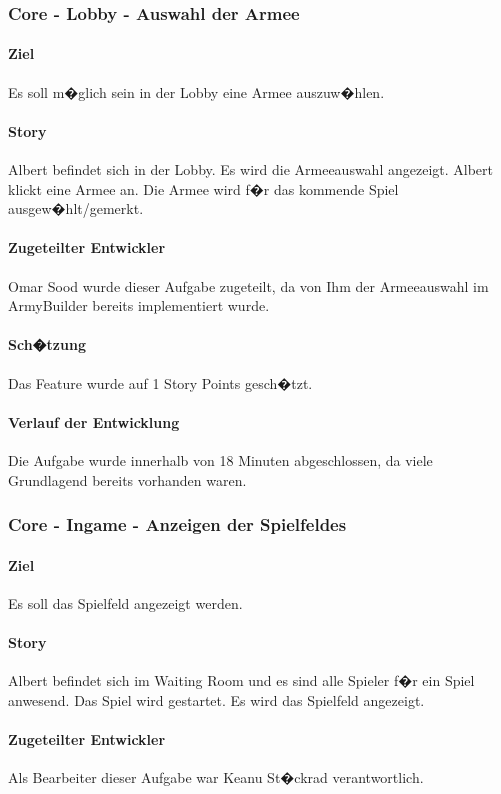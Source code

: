 \documentclass[12pt, titlepage]{scrartcl}
\begin{document}
		\subsubsection{Core - Lobby - Auswahl der Armee }
		\paragraph{Ziel} Es soll m�glich sein in der Lobby eine Armee auszuw�hlen. 
		\paragraph{Story} Albert befindet sich in der Lobby. Es wird die Armeeauswahl angezeigt. Albert klickt eine Armee an. Die Armee wird f�r das kommende Spiel ausgew�hlt/gemerkt.
		\paragraph{Zugeteilter Entwickler} Omar Sood wurde dieser Aufgabe zugeteilt, da von Ihm der Armeeauswahl im ArmyBuilder bereits implementiert wurde.
		\paragraph{Sch�tzung}
		Das Feature wurde auf 1 Story Points gesch�tzt.
		\paragraph{Verlauf der Entwicklung} 
		Die Aufgabe wurde innerhalb von 18 Minuten abgeschlossen, da viele Grundlagend bereits vorhanden waren.
		
		\subsubsection{Core - Ingame - Anzeigen der Spielfeldes}
		\paragraph{Ziel} Es soll das Spielfeld angezeigt werden.
		\paragraph{Story}Albert befindet sich im Waiting Room und es sind alle Spieler f�r ein Spiel anwesend. Das Spiel wird gestartet. Es wird das Spielfeld angezeigt.
		\paragraph{Zugeteilter Entwickler} Als Bearbeiter dieser Aufgabe war Keanu St�ckrad verantwortlich.
\end{document}
